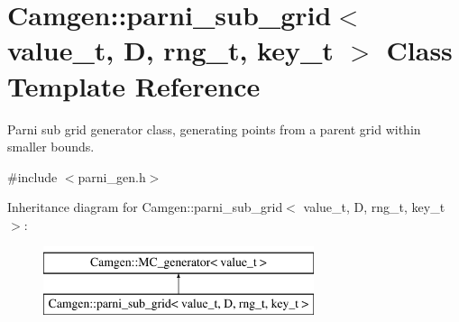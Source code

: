\hypertarget{a00397}{}\section{Camgen\+:\+:parni\+\_\+sub\+\_\+grid$<$ value\+\_\+t, D, rng\+\_\+t, key\+\_\+t $>$ Class Template Reference}
\label{a00397}


Parni sub grid generator class, generating points from a parent grid within smaller bounds.  




{\ttfamily \#include $<$parni\+\_\+gen.\+h$>$}

Inheritance diagram for Camgen\+:\+:parni\+\_\+sub\+\_\+grid$<$ value\+\_\+t, D, rng\+\_\+t, key\+\_\+t $>$\+:\begin{figure}[H]
\begin{center}
\leavevmode
\includegraphics[height=2.000000cm]{a00397}
\end{center}
\end{figure}
